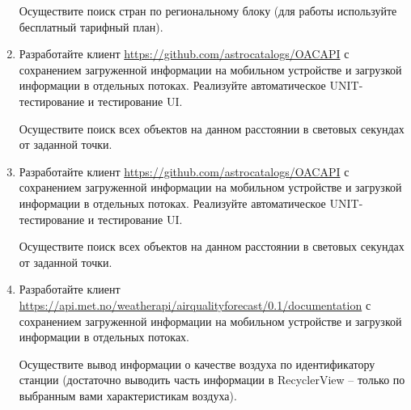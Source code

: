 \begin{enumerate}
		Осуществите поиск стран по региональному блоку (для работы используйте бесплатный тарифный план).

 	\item Разработайте клиент \url{https://github.com/astrocatalogs/OACAPI} с сохранением загруженной информации на мобильном устройстве и загрузкой
		информации в отдельных потоках. Реализуйте автоматическое UNIT-тестирование и тестирование UI.

		Осуществите поиск всех объектов на данном расстоянии в световых секундах от заданной точки.

  	\item Разработайте клиент \url{https://github.com/astrocatalogs/OACAPI} с сохранением загруженной информации на мобильном устройстве и загрузкой
		информации в отдельных потоках. Реализуйте автоматическое UNIT-тестирование и тестирование UI.

		Осуществите поиск всех объектов на данном расстоянии в световых секундах от заданной точки.

 	







	\item Разработайте клиент \url{https://api.met.no/weatherapi/airqualityforecast/0.1/documentation} с сохранением загруженной информации на мобильном устройстве и загрузкой
		информации в отдельных потоках. 

		Осуществите вывод информации о качестве воздуха по идентификатору станции (достаточно выводить часть информации в RecyclerView -- только
		по выбранным вами характеристикам воздуха).








\end{enumerate}

